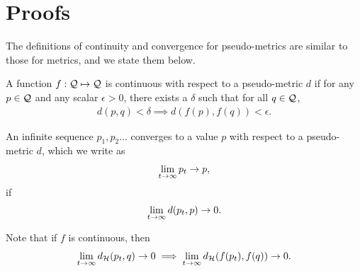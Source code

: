 \pagebreak

\appendix

\section{Proofs}\label{sec:proofs}
The definitions of continuity and convergence for pseudo-metrics are similar to those for metrics, and we state them below.

A function $f: {\mathcal{Q}} \mapsto {\mathcal{Q}}$ is continuous with respect to a pseudo-metric $d$ if for any $p \in {\mathcal{Q}}$ and any scalar $\epsilon > 0$, there exists a $\delta$ such that for all \mbox{$q \in {\mathcal{Q}}$},
\begin{align*}
    d(p, q) < \delta
    \implies
    d(f(p), f(q)) < \epsilon.
\end{align*}

An infinite sequence $p_1, p_2 \dots$ converges to a value $p$ with respect to a pseudo-metric $d$, which we write as
\begin{align*}
    \lim_{t \rightarrow \infty} p_t \rightarrow p,
\end{align*}
if
\begin{align*}
    \lim_{t \rightarrow \infty} d(p_t, p) \rightarrow 0.
\end{align*}

Note that if $f$ is continuous, then
\begin{align*}
    \lim_{t \rightarrow \infty} {d_{\mathcal{H}}}(p_t, q) \rightarrow 0
    \implies
    \lim_{t \rightarrow \infty} {d_{\mathcal{H}}}(f(p_t), f(q)) \rightarrow 0.
\end{align*}

